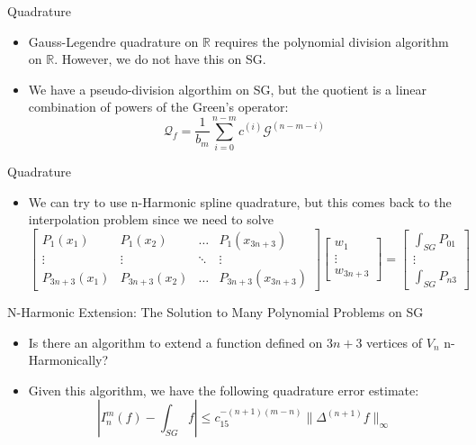 \documentclass[xcolor = dvipsnames]{beamer}
\begin{document}
\begin{frame}{Quadrature}
    \begin{itemize}
        \item Gauss-Legendre quadrature on $\mathbb{R}$ requires the polynomial division algorithm on $\mathbb{R}$. However, we do not have this on SG.
        \item We have a pseudo-division algorthim on SG, but the quotient is a linear combination of powers of the Green's operator:
        $$
        \mathcal{Q}_f = \frac{1}{b_m}
        \sum\limits_{i = 0}^{n-m}c^{(i)}\mathcal{G}^{(n-m-i)}
        $$
    \end{itemize}
\end{frame}

\begin{frame}{Quadrature}
    \begin{itemize}
        \item We can try to use n-Harmonic spline quadrature, but this comes back to the interpolation problem since we need to solve
        $$
            \begin{bmatrix}
    P_{1}(x_1) & P_{1}(x_{2}) & \dots & P_{1}(x_{3n+3})\\
    \vdots & \vdots & \ddots & \vdots \\
    P_{3n+3}(x_{1}) & P_{3n+3}(x_{2}) & \dots & P_{3n+3}(x_{3n+3})
    \end{bmatrix}
    \begin{bmatrix}
    w_1\\
    \vdots\\
    w_{3n+3}
    \end{bmatrix} = 
    \begin{bmatrix}
    \int_{SG}P_{01}\\
    \vdots\\
    \int_{SG}P_{n3}
    \end{bmatrix}
    $$
    
    \end{itemize}
\end{frame}

\begin{frame}{N-Harmonic Extension: The Solution to Many Polynomial Problems on SG}
    \begin{itemize}
        \item Is there an algorithm to extend a function defined on $3n+3$ vertices of $V_n$ n-Harmonically?
        \item Given this algorithm, we have the following quadrature error estimate:
        $$
        \left|I_n^m(f) - \int_{SG}f\right|\leq c_15^{-(n+1)(m-n)}\|\Delta^{(n+1)}f\|_\infty
        $$
    \end{itemize}
\end{frame}
\end{document}
